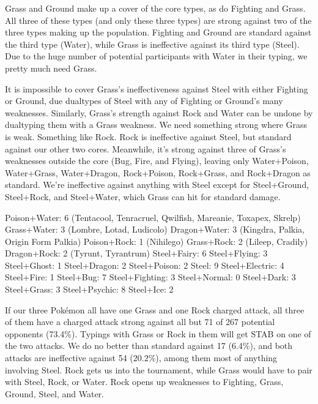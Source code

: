 Grass and Ground make up a cover of the core types, as do Fighting and Grass.
All three of these types (and only these three types) are strong against two of the three
  types making up the population.
Fighting and Ground are standard against the third type (Water), while Grass is ineffective
  against its third type (Steel).
Due to the huge number of potential participants with Water in their typing, we pretty
  much need Grass.

It is impossible to cover Grass's ineffectiveness against Steel with either Fighting or Ground,
  due dualtypes of Steel with any of Fighting or Ground's many weaknesses.
Similarly, Grass's strength against Rock and Water can be undone by dualtyping them with a Grass weakness.
We need something strong where Grass is weak.
Something like Rock.
Rock is ineffective against Steel, but standard against our other two cores.
Meanwhile, it's strong against three of Grass's weaknesses outside the core (Bug, Fire, and Flying),
  leaving only Water+Poison, Water+Grass, Water+Dragon, Rock+Poison, Rock+Grass, and Rock+Dragon
  as standard.
We're ineffective against anything with Steel except for Steel+Ground, Steel+Rock, and Steel+Water, which
  Grass can hit for standard damage.

  Poison+Water: 6 (Tentacool, Tenracruel, Qwilfish, Mareanie, Toxapex, Skrelp)
  Grass+Water: 3 (Lombre, Lotad, Ludicolo)
  Dragon+Water: 3 (Kingdra, Palkia, Origin Form Palkia)
  Poison+Rock: 1 (Nihilego)
  Grass+Rock: 2 (Lileep, Cradily)
  Dragon+Rock: 2 (Tyrunt, Tyrantrum)
  Steel+Fairy: 6
  Steel+Flying: 3
  Steel+Ghost: 1
  Steel+Dragon: 2
  Steel+Poison: 2
  Steel: 9
  Steel+Electric: 4
  Steel+Fire: 1
  Steel+Bug: 7
  Steel+Fighting: 3
  Steel+Normal: 0
  Steel+Dark: 3
  Steel+Grass: 3
  Steel+Psychic: 8
  Steel+Ice: 2

If our three Pokémon all have one Grass and one Rock charged attack,
  all three of them have a charged attack strong against all but
  71 of 267 potential opponents (73.4\%).
Typings with Grass or Rock in them will get STAB on one of the two attacks.
We do no better than standard against 17 (6.4\%), and both attacks are
  ineffective against 54 (20.2\%), among them most of anything involving
  Steel.
Rock gets us into the tournament, while Grass would have to pair with Steel,
  Rock, or Water.
Rock opens up weaknesses to Fighting, Grass, Ground, Steel, and Water.

